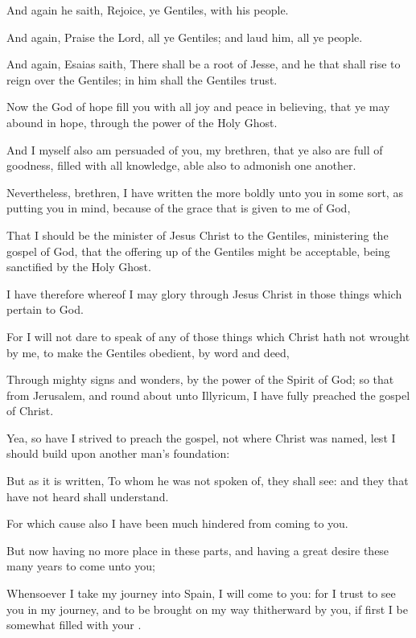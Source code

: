 {And
again he
saith,
Rejoice, ye
Gentiles,
with
his
people.

And
again,
Praise the
Lord,
all ye
Gentiles;
and
laud
him,
all ye
people.

And
again,
Esaias
saith, There shall
be a
root of
Jesse,
and he that shall
rise to reign
over the
Gentiles;
in
him
shall the
Gentiles
trust.

Now the
God of
hope
fill
you
with
all
joy
and
peace
in
believing,
that
ye may
abound
in
hope,
through the
power of
the
Holy
Ghost.

And
I
myself
also am
persuaded
of
you,
my
brethren,
that
ye
also
are
full of
goodness,
filled
with
all
knowledge,
able
also to
admonish one
another.

Nevertheless,
brethren, I have
written the more
boldly unto
you
in some
sort,
as
putting
you in
mind, because
of the
grace that is
given to
me
of
God,

That
I should
be the
minister of
Jesus
Christ
to the
Gentiles,
ministering the
gospel of
God,
that the offering
up of the
Gentiles might
be
acceptable, being
sanctified
by
the
Holy
Ghost.

I
have
therefore whereof I may
glory
through
Jesus
Christ
in those things which
pertain
to
God.

For I
will
not
dare to
speak of any of those
things
which
Christ
hath
not
wrought
by
me, to
make the
Gentiles
obedient, by
word
and
deed,

Through
mighty
signs
and
wonders,
by the
power of the
Spirit of
God; so
that
from
Jerusalem,
and round
about
unto
Illyricum, I have fully
preached the
gospel of
Christ.

Yea,
so have I
strived to preach the
gospel,
not
where
Christ was
named,
lest I should
build
upon another
man’s
foundation:

But
as it is
written, To
whom
he
was
not
spoken
of, they shall
see:
and they that
have
not
heard shall
understand.

For which
cause
also I have
been
much
hindered from
coming
to
you.

But
now
having no
more
place
in
these
parts,
and
having a great
desire
these
many
years to
come
unto
you;

Whensoever I take my
journey
into
Spain, I will
come
to
you:
for I
trust to
see
you in my
journey,
and to be brought on my
way
thitherward
by
you,
if
first I
be
somewhat filled
with
your
{}.

}
